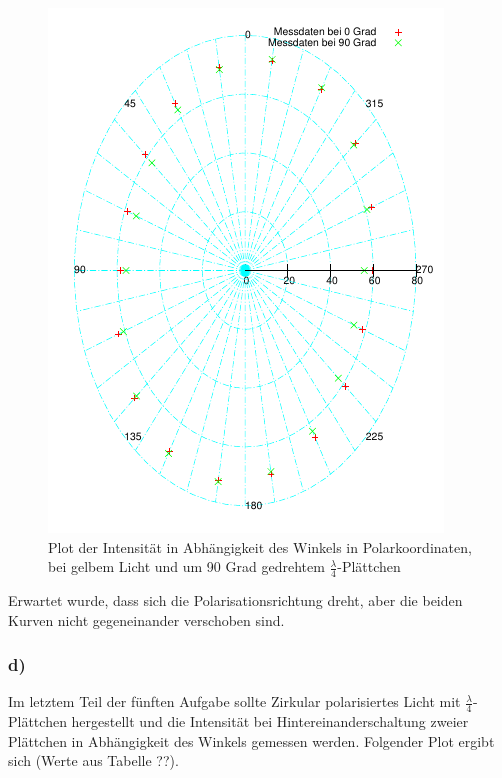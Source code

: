 \documentclass[12pt]{scrartcl}
\begin{document}
\begin{figure}[H]
\centering
    \includegraphics[scale = 1]{a_5_c_2.pdf}
  	\caption[Plot der Intensität in Abhängigkeit des Winkels in Polarkoordinaten, bei gelbem Licht und um 90 Grad gedrehtem $\frac{\lambda}{4}$-Plättchen]{Plot der Intensität in Abhängigkeit des Winkels in Polarkoordinaten, bei gelbem Licht und um 90 Grad gedrehtem $\frac{\lambda}{4}$-Plättchen}
  \label{fig:a_5_c_2}
\end{figure}

Erwartet wurde, dass sich die Polarisationsrichtung dreht, aber die beiden Kurven nicht gegeneinander verschoben sind. 


\subsubsection{d)}
Im letztem Teil der fünften Aufgabe sollte Zirkular polarisiertes Licht mit $\frac{\lambda}{4}$-Plättchen hergestellt und die Intensität bei Hintereinanderschaltung zweier Plättchen in Abhängigkeit des Winkels gemessen werden. Folgender Plot ergibt sich (Werte aus Tabelle ??).
\end{document}
